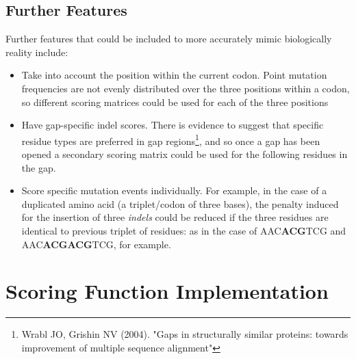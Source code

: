 \documentclass[a4paper]{article}
\begin{document}
\subsection{Further Features}
Further features that could be included to more accurately mimic biologically reality include:
\begin{itemize}
\item Take into account the position within the current codon. Point mutation frequencies are not evenly distributed over the three positions within a codon, so different scoring matrices could be used for each of the three positions
\item Have gap-specific indel scores. There is evidence to suggest that specific residue types are preferred in gap regions\footnote{Wrabl JO, Grishin NV (2004). "Gaps in structurally similar proteins: towards improvement of multiple sequence alignment" }, and so once a gap has been opened a secondary scoring matrix could be used for the following residues in the gap.
\item Score specific mutation events individually. For example, in the case of a duplicated amino acid (a triplet/codon of three bases), the penalty induced for the insertion of three \textit{indels} could be reduced if the three residues are identical to previous triplet of residues: as in the case of AAC\textbf{ACG}TCG and AAC\textbf{ACGACG}TCG, for example. 

\end{itemize}
\section{Scoring Function Implementation}
\end{document}
